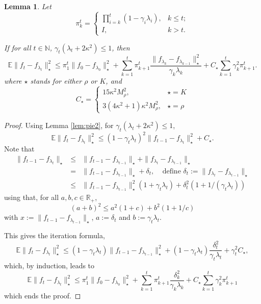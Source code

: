 \documentclass[twoside,11pt]{amsart}
\theoremstyle{theorem}
\newtheorem{lem}[thm]{Lemma}
\theoremstyle{definition}
\theoremstyle{remark}
\newcommand{\DS}{\displaystyle}
\def\R{{\mathbb R}}        %
\def\E{{\mathbb E}}        %
\def\M{M_\rho}
\def\N{{\mathbb N}}
\def\la{\lambda}
\def\ka{\kappa}
\def\ga{\gamma}
\def\st{\star}
\begin{document}
\begin{lem} \label{lem:expan}
Let 
\begin{equation} \pi_k^t=
\left\{
\begin{array}{lr}
\DS \prod_{i=k}^t \left( 1 - \gamma_i \la_i\right), & k\leq t; \\
I, & k>t.
\end{array}
\right.
\end{equation}

If for all $t\in \N$, $\ga_t (\la_t + 2 \ka^2) \leq 1$, then
\[ \E \|f_t - f_{\la_t}\|_\st^2 \leq \pi_1^t \|f_0 - f_{\la_0}\|_\st^2 + 
\sum_{k=1}^t \pi_{k+1}^t \frac{\|f_{\la_k}-f_{\la_{k-1}}\|_\st^2}{\ga_k\la_k} + C_\st \sum_{k=1}^t \ga_k^2\pi_{k+1}^t.\]
where $\st$ stands for either $\rho$ or $K$, and 
\[C_\st = \left\{\begin{array}{rl}
15  \ka^2 \M^2, & \st = K \\
3 (4\ka^2+1) \ka^2 \M^2 , & \st=\rho
\end{array}
\right.
\]
\end{lem}

\begin{proof}
Using Lemma \ref{lem:pie2}, for $\ga_t (\la_t + 2 \ka^2) \leq 1$,
\[ \E \|f_t - f_{\la_t}\|_\st^2 \leq  (1 - \ga_t \la_t )^2 \|f_{t-1}-f_{\la_{t}}\|_\st^2  + C_\st.\]
Note that 
\begin{eqnarray*} 
\|f_{t-1}-f_{\la_{t}}\|_\st & \leq & \|f_{t-1}-f_{\la_{t-1}}\|_\st + \|f_{\la_t} - f_{\la_{t-1}}\|_\st \\
& = &  \|f_{t-1}-f_{\la_{t-1}}\|_\st + \delta_t, \ \ \ \ \ \mbox{define $\DS \delta_t:=\|f_{\la_t} - f_{\la_{t-1}}\|_\st$} \\
& \leq &  \|f_{t-1}-f_{\la_{t-1}}\|_\st^2 ( 1 + \ga_t \la_t) + \delta_t^2 (1+ 1/(\ga_t\la_t))
\end{eqnarray*}
using that, for all $a,b,c\in \R_+$,
\[ (a+b)^2 \leq a^2(1+c)+b^2(1+1/c) \]
with $x:=\|f_{t-1}-f_{\la_{t-1}}\|_\st$, $a:=\delta_t$ and $b:=\ga_t\la_t$. 

This gives the iteration formula,
\[ \E \|f_t - f_{\la_t}\|_\st^2 \leq  (1 - \ga_t \la_t ) \|f_{t-1}-f_{\la_{t-1}}\|_\st^2 + (1-\ga_t \la_t)\frac{\delta_t^2}{\ga_t\la_t}+  \ga_t^2 C_\st,\]
which, by induction, leads to 
\[ \E \|f_t - f_{\la_t}\|_\st^2 \leq \pi_1^t \|f_0 - f_{\la_0}\|_\st^2 + \sum_{k=1}^t \pi_{k+1}^t \frac{\delta_k^2}{\ga_k\la_k} + 
C_\st \sum_{k=1}^t \ga_k^2\pi_{k+1}^t\]
which ends the proof.
\end{proof}
\end{document}

